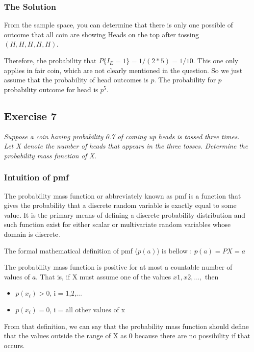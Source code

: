 \documentclass[12pt,a4paper]{article}
\begin{document}
\subsubsection{The Solution}

From the sample space, you can determine that there is only one possible of outcome that all coin are showing Heads on the top after tossing $(H,H,H,H,H)$.

Therefore, the probability that $P\{I_E = 1\} = 1/(2*5) = 1/10$. This one only applies in fair coin, which are not clearly mentioned in the question. So we just assume that the probability of head outcomes is $p$. The probability for $p$ probability outcome for head is $p^5$.


\subsection{Exercise 7}

\textit{Suppose a coin having probability 0.7 of coming up heads is tossed three times. Let X denote the number of heads that appears in the three tosses. Determine the probability mass function of X.}


\subsubsection{Intuition of pmf}

The probability mass function or abbreviately known as pmf is a function that gives the probability that a discrete random variable is exactly equal to some value. It is the primary means of defining a discrete probability distribution and such function exist for either scalar or multivariate random variables whose domain is discrete.

The formal mathematical definition of pmf ($p(a)$) is bellow :
$ p(a) = P{X = a} $

The probability mass function is positive for at most a countable number of values of $a$. That is, if X must assume one of the values $x1,x2,...,$ then

\begin{itemize}
	\item $p(x_i) > 0$, i = 1,2,...
	\item $p(x_i) = 0$, i = all other values of x
\end{itemize}

From that definition, we can say that the probability mass function should define that the values outside the range of X as 0 because there are no possibility if that occurs.
\end{document}
